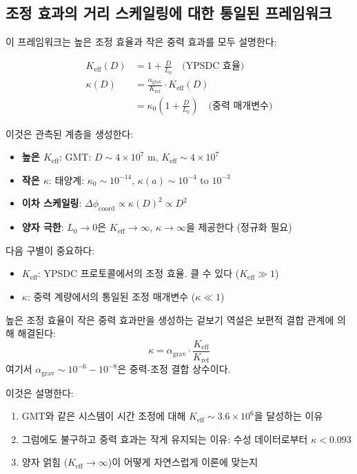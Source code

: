 \documentclass[11pt,a4paper]{article}
\begin{document}
\subsection{조정 효과의 거리 스케일링에 대한 통일된 프레임워크}

이 프레임워크는 높은 조정 효율과 작은 중력 효과를 모두 설명한다:

\begin{align}
K_{\mathrm{eff}}(D) &= 1 + \frac{D}{L_0} \quad \text{(YPSDC 효율)} \\
\kappa(D) &= \frac{\alpha_{\text{grav}}}{K_{\text{ref}}} \cdot K_{\mathrm{eff}}(D) \\
&= \kappa_0 \left(1 + \frac{D}{L_0}\right) \quad \text{(중력 매개변수)}
\end{align}

이것은 관측된 계층을 생성한다:
\begin{itemize}
\item \textbf{높은 $K_{\mathrm{eff}}$}: GMT: $D \sim 4\times10^7$ m, $K_{\mathrm{eff}} \sim 4\times10^7$
\item \textbf{작은 $\kappa$}: 태양계: $\kappa_0 \sim 10^{-14}$, $\kappa(a) \sim 10^{-4}$ to $10^{-3}$
\item \textbf{이차 스케일링}: $\Delta\phi_{\text{coord}} \propto \kappa(D)^2 \propto D^2$
\item \textbf{양자 극한}: $L_0 \to 0$은 $K_{\mathrm{eff}} \to \infty$, $\kappa \to \infty$을 제공한다 (정규화 필요)
\end{itemize}

다음 구별이 중요하다:
\begin{itemize}
\item \textbf{$K_{\mathrm{eff}}$}: YPSDC 프로토콜에서의 조정 효율. 클 수 있다 ($K_{\mathrm{eff}} \gg 1$)
\item \textbf{$\kappa$}: 중력 계량에서의 통일된 조정 매개변수 ($\kappa \ll 1$)
\end{itemize}

높은 조정 효율이 작은 중력 효과만을 생성하는 겉보기 역설은 보편적 결합 관계에 의해 해결된다:
\begin{equation}
\boxed{\kappa = \alpha_{\text{grav}} \cdot \frac{K_{\mathrm{eff}}}{K_{\text{ref}}}}
\end{equation}
여기서 $\alpha_{\text{grav}} \sim 10^{-6} - 10^{-8}$은 중력-조정 결합 상수이다.

이것은 설명한다:
\begin{enumerate}
\item GMT와 같은 시스템이 시간 조정에 대해 $K_{\mathrm{eff}} \sim 3.6\times10^6$을 달성하는 이유
\item 그럼에도 불구하고 중력 효과는 작게 유지되는 이유: 수성 데이터로부터 $\kappa < 0.093$
\item 양자 얽힘 ($K_{\mathrm{eff}} \to \infty$)이 어떻게 자연스럽게 이론에 맞는지
\end{enumerate}
\end{document}
